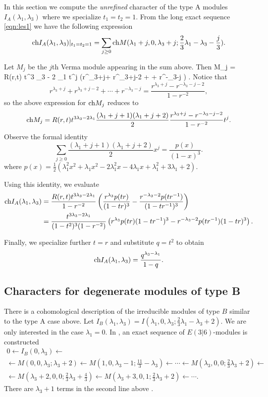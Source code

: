 \documentclass[11pt]{amsart}
\begin{document}
\parsec[s:typeAunrefinedKR]
In this section we compute the {\em unrefined} character of the type A modules $I_A(\lambda_1,\lambda_3)$ where we specialize $t_1=t_2=1$.
From the long exact sequence \eqref{eqn:les1} we have the following expression 
\[
{\rm ch} I_A(\lambda_1,\lambda_3)|_{t_1=t_2=1} = \sum_{j \geq 0} {\rm ch} M(\lambda_1+j,0,\lambda_3+j;\frac23 \lambda_1 - \lambda_3 - \frac{j}{3}) .
\]

Let $M_j$ be the $j$th Verma module appearing in the sum above. 
Then
\beqn
\ch M_j = R(r,t) t^{3 \lambda_3 - 2 \lambda_1}  t^j \left(r^{\lambda_3+j}+ r^{\lambda_3+j-2} + \cdots + r^{-\lambda_3-j} \right) .
\eeqn
Notice that 
\[
r^{\lambda_3+j}+ r^{\lambda_3+j-2} + \cdots + r^{-\lambda_3-j} = \frac{r^{\lambda_3+j}-r^{-\lambda_3-j-2}}{1-r^{-2}} ,
\]
so the above expression for ${\rm ch} M_j$ reduces to
\[
{\rm ch} M_j = R(r,t) t^{3 \lambda_3 - 2 \lambda_1} \frac{(\lambda_1+j+1)(\lambda_1+j+2)}{2} \frac{r^{\lambda_3+j}-r^{-\lambda_3-j-2}}{1-r^{-2}} t^j .
\]
Observe the formal identity 
\[
\sum_{j \geq 0} \frac{(\lambda_1+j+1)(\lambda_1+j+2)}{2} x^j = \frac{p(x)}{(1-x)^3}  .
\]
where $p(x) = \frac12 \left(\lambda_1^2 x^2 + \lambda_1 x^2 - 2\lambda_1^2x -4 \lambda_1 x + \lambda_1^2 + 3\lambda_1 +2\right)$. 

Using this identity, we evaluate
\begin{align*}
{\rm ch} I_A(\lambda_1,\lambda_3) & = \frac{R(r,t) t^{3 \lambda_3 - 2 \lambda_1}}{1-r^{-2}} \left(\frac{r^{\lambda_3} p(tr)}{(1-tr)^3} - \frac{r^{-\lambda_3-2}p(tr^{-1})}{(1-tr^{-1})^3} \right) \\ 
& = \frac{t^{3 \lambda_3-2\lambda_1}}{(1-t^2)^3(1-r^{-2})} \left(r^{\lambda_3} p(tr) (1-tr^{-1})^3 - r^{-\lambda_3-2} p(tr^{-1})(1-tr)^3 \right) .
\end{align*}

Finally, we specialize further $t=r$ and substitute $q = t^2$ to obtain
\[
{\rm ch} I_A(\lambda_1,\lambda_3) = \frac{q^{\lambda_3 - \lambda_1}}{1-q} .
\]

\subsection{Characters for degenerate modules of type B} \label{s:typeB}

There is a cohomological description of the irreducible modules of type $B$ similar to the type A case above.
Let $I_B(\lambda_1,\lambda_3) = I(\lambda_1,0,\lambda_3;\frac23 \lambda_1 - \lambda_3+2)$. 
We are only interested in the case $\lambda_1 = 0$.  
In \cite{KR2}, an exact sequence of $E(3|6)$-modules is constructed
\begin{multline}\label{eqn:les1}
0 \leftarrow  I_B(0,\lambda_3) \leftarrow \\ \leftarrow M(0,0,\lambda_3;\lambda_3 + 2) \leftarrow  M(1,0,\lambda_3-1;\frac{11}{3} - \lambda_3)  \leftarrow \cdots \leftarrow M(\lambda_3, 0, 0;\frac23 \lambda_3 +2) \leftarrow \\
 \leftarrow M(\lambda_3+2, 0, 0; \frac23 \lambda_3 + \frac43) \leftarrow M(\lambda_3+3, 0, 1; \frac23 \lambda_3 + 2) \leftarrow \cdots .
\end{multline}
There are $\lambda_3+1$ terms in the second line above .  


\parsec[s:typeBunrefinedKR]
\end{document}
